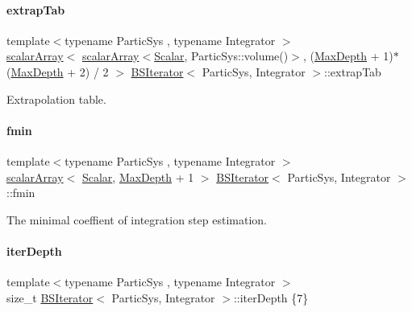 \paragraph{\texorpdfstring{extrap\+Tab}{extrapTab}}
{\footnotesize\ttfamily template$<$typename Partic\+Sys , typename Integrator $>$ \\
\mbox{\hyperlink{class_b_s_iterator_ab0aa7c10b56500273af05dcd85fd8389}{scalar\+Array}}$<$ \mbox{\hyperlink{class_b_s_iterator_ab0aa7c10b56500273af05dcd85fd8389}{scalar\+Array}}$<$\mbox{\hyperlink{class_b_s_iterator_a7857f8ff9032955ea4dcc22cd18ca7a1}{Scalar}}, Partic\+Sys\+::volume()$>$, (\mbox{\hyperlink{class_b_s_iterator_a39409b9a12d4854d101ce59a0efc0f74}{Max\+Depth}} + 1)$\ast$ (\mbox{\hyperlink{class_b_s_iterator_a39409b9a12d4854d101ce59a0efc0f74}{Max\+Depth}} + 2) / 2 $>$ \mbox{\hyperlink{class_b_s_iterator}{B\+S\+Iterator}}$<$ Partic\+Sys, Integrator $>$\+::extrap\+Tab\hspace{0.3cm}{\ttfamily [private]}}



Extrapolation table. 

\mbox{\label{class_b_s_iterator_a05bf5c727d23e47349683cda1a08ed13}} 
\paragraph{\texorpdfstring{fmin}{fmin}}
{\footnotesize\ttfamily template$<$typename Partic\+Sys , typename Integrator $>$ \\
\mbox{\hyperlink{class_b_s_iterator_ab0aa7c10b56500273af05dcd85fd8389}{scalar\+Array}}$<$ \mbox{\hyperlink{class_b_s_iterator_a7857f8ff9032955ea4dcc22cd18ca7a1}{Scalar}}, \mbox{\hyperlink{class_b_s_iterator_a39409b9a12d4854d101ce59a0efc0f74}{Max\+Depth}} + 1 $>$ \mbox{\hyperlink{class_b_s_iterator}{B\+S\+Iterator}}$<$ Partic\+Sys, Integrator $>$\+::fmin\hspace{0.3cm}{\ttfamily [private]}}



The minimal coeffient of integration step estimation. 

\mbox{\label{class_b_s_iterator_aa073f847cc5855f727c8f326f539a5f0}} 
\paragraph{\texorpdfstring{iter\+Depth}{iterDepth}}
{\footnotesize\ttfamily template$<$typename Partic\+Sys , typename Integrator $>$ \\
size\+\_\+t \mbox{\hyperlink{class_b_s_iterator}{B\+S\+Iterator}}$<$ Partic\+Sys, Integrator $>$\+::iter\+Depth \{7\}\hspace{0.3cm}{\ttfamily [private]}}



